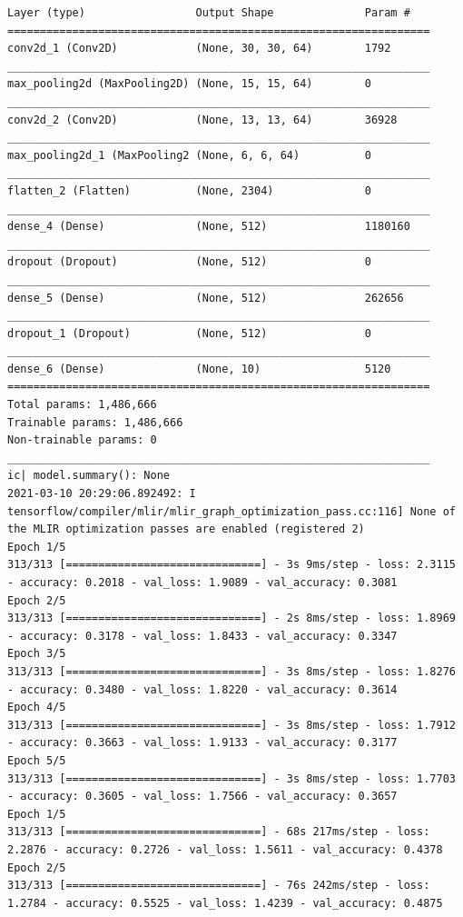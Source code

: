 \documentclass{tron}
\begin{document}
\begin{lstlisting}[style=mystyle:output, label=output:p3]
Layer (type)                 Output Shape              Param #
=================================================================
conv2d_1 (Conv2D)            (None, 30, 30, 64)        1792
_________________________________________________________________
max_pooling2d (MaxPooling2D) (None, 15, 15, 64)        0
_________________________________________________________________
conv2d_2 (Conv2D)            (None, 13, 13, 64)        36928
_________________________________________________________________
max_pooling2d_1 (MaxPooling2 (None, 6, 6, 64)          0
_________________________________________________________________
flatten_2 (Flatten)          (None, 2304)              0
_________________________________________________________________
dense_4 (Dense)              (None, 512)               1180160
_________________________________________________________________
dropout (Dropout)            (None, 512)               0
_________________________________________________________________
dense_5 (Dense)              (None, 512)               262656
_________________________________________________________________
dropout_1 (Dropout)          (None, 512)               0
_________________________________________________________________
dense_6 (Dense)              (None, 10)                5120
=================================================================
Total params: 1,486,666
Trainable params: 1,486,666
Non-trainable params: 0
_________________________________________________________________
ic| model.summary(): None
2021-03-10 20:29:06.892492: I tensorflow/compiler/mlir/mlir_graph_optimization_pass.cc:116] None of the MLIR optimization passes are enabled (registered 2)
Epoch 1/5
313/313 [==============================] - 3s 9ms/step - loss: 2.3115 - accuracy: 0.2018 - val_loss: 1.9089 - val_accuracy: 0.3081
Epoch 2/5
313/313 [==============================] - 2s 8ms/step - loss: 1.8969 - accuracy: 0.3178 - val_loss: 1.8433 - val_accuracy: 0.3347
Epoch 3/5
313/313 [==============================] - 3s 8ms/step - loss: 1.8276 - accuracy: 0.3480 - val_loss: 1.8220 - val_accuracy: 0.3614
Epoch 4/5
313/313 [==============================] - 3s 8ms/step - loss: 1.7912 - accuracy: 0.3663 - val_loss: 1.9133 - val_accuracy: 0.3177
Epoch 5/5
313/313 [==============================] - 3s 8ms/step - loss: 1.7703 - accuracy: 0.3605 - val_loss: 1.7566 - val_accuracy: 0.3657
Epoch 1/5
313/313 [==============================] - 68s 217ms/step - loss: 2.2876 - accuracy: 0.2726 - val_loss: 1.5611 - val_accuracy: 0.4378
Epoch 2/5
313/313 [==============================] - 76s 242ms/step - loss: 1.2784 - accuracy: 0.5525 - val_loss: 1.4239 - val_accuracy: 0.4875

\end{lstlisting}
\end{document}
